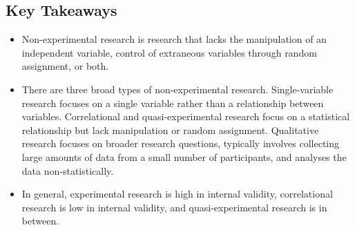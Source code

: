 \subsection{Key Takeaways}
\begin{fullwidth}
\begin{itemize}

\item Non-experimental research is research that lacks the manipulation of an independent variable, control of extraneous variables through random assignment, or both.

\item There are three broad types of non-experimental research. Single-variable research focuses on a single variable rather than a relationship between variables. Correlational and quasi-experimental research focus on a statistical relationship but lack manipulation or random assignment. Qualitative research focuses on broader research questions, typically involves collecting large amounts of data from a small number of participants, and analyses the data non-statistically.

\item In general, experimental research is high in internal validity, correlational research is low in internal validity, and quasi-experimental research is in between.

\end{itemize}
\end{fullwidth}


